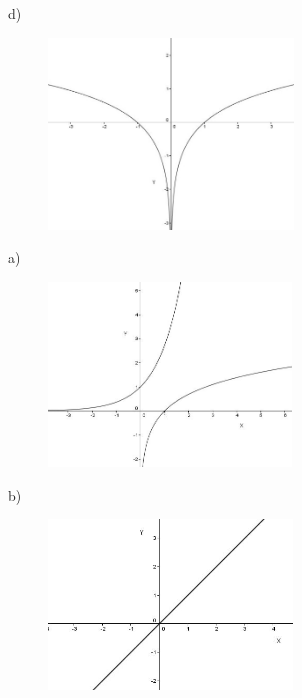 \begin{respostas}{7}
d)\begin{figure}[H]
	\begin{Center}
		\includegraphics[width=2.56in,height=2.0in]{capitulos/logaritmos_e_funcao_logaritmica/media/image22.jpeg}
	\end{Center}
\end{figure}

    \ansitem{}

a)\begin{figure}[H]
    \begin{Center}
        \includegraphics[width=2.54in,height=1.93in]{capitulos/logaritmos_e_funcao_logaritmica/media/image23.JPG}
    \end{Center}
\end{figure}

b)\begin{figure}[H]
    \begin{Center}
        \includegraphics[width=2.55in,height=1.78in]{capitulos/logaritmos_e_funcao_logaritmica/media/image24.JPG}
    \end{Center}
\end{figure}


\end{respostas}
